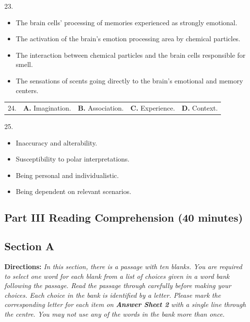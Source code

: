 \documentclass[UTF8,11pt]{ctexart}
\begin{document}
23.


\begin{itemize}[leftmargin=2em,itemsep=.2em,topsep=.4em]\item[A.] The brain cells’ processing of memories experienced as strongly emotional.
\item[B.] The activation of the brain’s emotion processing area by chemical particles.
\item[C.] The interaction between chemical particles and the brain cells responsible for smell.
\item[D.] The sensations of scents going directly to the brain’s emotional and memory centers.
\end{itemize}

\noindent\begin{tabularx}{\linewidth}{@{}lXXXX@{}}24. & \textbf{A.} Imagination. & \textbf{B.} Association. & \textbf{C.} Experience. & \textbf{D.} Context.\\\end{tabularx}\par

25.


\begin{itemize}[leftmargin=2em,itemsep=.2em,topsep=.4em]\item[A.] Inaccuracy and alterability.
\item[B.] Susceptibility to polar interpretations.
\item[C.] Being personal and individualistic.
\item[D.] Being dependent on relevant scenarios.
\end{itemize}

\subsection*{\textbf{Part III Reading Comprehension (40 minutes)}}


\subsection*{\textbf{Section A}}


\textbf{Directions:} \textit{In this section, there is a passage with ten blanks. You are required to select one word for each blank} \textit{from a list of choices given in a word bank following the passage. Read the passage through carefully before} \textit{making your choices. Each choice in the bank is identified by a letter. Please mark the corresponding letter for} \textit{each item on }\textbf{\textit{Answer Sheet 2}}\textit{ with a single line through the centre. You may not use any of the words in the bank} \textit{more than once.}
\end{document}
